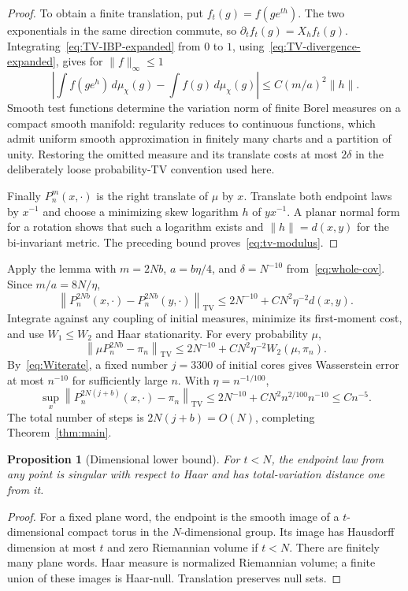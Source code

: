 \documentclass[11pt]{article}
\newtheorem{proposition}[theorem]{Proposition}
\theoremstyle{definition}\newtheorem{definition}[theorem]{Definition}
\theoremstyle{remark}\newtheorem{remark}[theorem]{Remark}
\newcommand{\TV}{\mathrm{TV}}
\newcommand{\norm}[1]{\left\lVert#1\right\rVert}
\begin{document}
\begin{proof}
To obtain a finite translation, put $f_t(g)=f(ge^{th})$. The two exponentials in the same direction commute, so
$\partial_tf_t(g)=X_hf_t(g)$. Integrating~\eqref{eq:TV-IBP-expanded} from $0$ to $1$, using~\eqref{eq:TV-divergence-expanded}, gives for $\|f\|_\infty\le1$
\[
 \left|\int f(ge^h)\,d\mu_\chi(g)-\int f(g)\,d\mu_\chi(g)\right|
 \le C(m/a)^2\|h\|.
\]
Smooth test functions determine the variation norm of finite Borel measures on a compact smooth manifold: regularity reduces to continuous functions, which admit uniform smooth approximation in finitely many charts and a partition of unity. Restoring the omitted measure and its translate costs at most $2\delta$ in the deliberately loose probability-TV convention used here.

Finally $P_n^m(x,\cdot)$ is the right translate of $\mu$ by $x$. Translate both endpoint laws by $x^{-1}$ and choose a minimizing skew logarithm $h$ of $yx^{-1}$. A planar normal form for a rotation shows that such a logarithm exists and $\|h\|=d(x,y)$ for the bi-invariant metric. The preceding bound proves~\eqref{eq:tv-modulus}.
\end{proof}

Apply the lemma with $m=2Nb$, $a=b\eta/4$, and $\delta=N^{-10}$ from~\eqref{eq:whole-cov}. Since $m/a=8N/\eta$,
\[
 \norm{P_n^{2Nb}(x,\cdot)-P_n^{2Nb}(y,\cdot)}_{\TV}
 \le2N^{-10}+CN^2\eta^{-2}d(x,y).
\]
Integrate against any coupling of initial measures, minimize its first-moment cost, and use $W_1\le W_2$ and Haar stationarity. For every probability $\mu$,
\begin{equation}\label{eq:TVtransfer}
 \norm{\mu P_n^{2Nb}-\pi_n}_{\TV}
 \le2N^{-10}+CN^2\eta^{-2}W_2(\mu,\pi_n).
\end{equation}
By~\eqref{eq:Witerate}, a fixed number $j=3300$ of initial cores gives Wasserstein error at most $n^{-10}$ for sufficiently large $n$. With $\eta=n^{-1/100}$,
\[
 \sup_x\norm{P_n^{2N(j+b)}(x,\cdot)-\pi_n}_{\TV}
 \le2N^{-10}+CN^2 n^{2/100}n^{-10}\le Cn^{-5}.
\]
The total number of steps is $2N(j+b)=O(N)$, completing Theorem~\ref{thm:main}.

\begin{proposition}[Dimensional lower bound]
For $t<N$, the endpoint law from any point is singular with respect to Haar and has total-variation distance one from it.
\end{proposition}
\begin{proof}
For a fixed plane word, the endpoint is the smooth image of a $t$-dimensional compact torus in the $N$-dimensional group. Its image has Hausdorff dimension at most $t$ and zero Riemannian volume if $t<N$. There are finitely many plane words. Haar measure is normalized Riemannian volume; a finite union of these images is Haar-null. Translation preserves null sets.
\end{proof}
\end{document}
